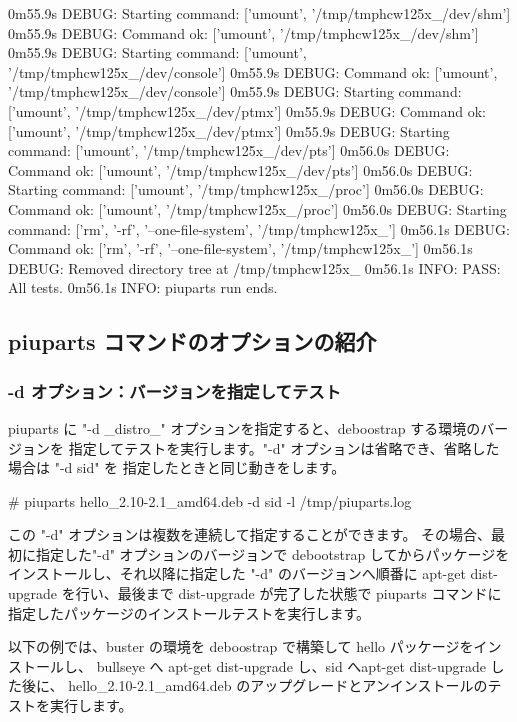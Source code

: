 \documentclass[mingoth,a4paper]{jsarticle}
\begin{document}
\begin{commandline}
0m55.9s DEBUG: Starting command: ['umount', '/tmp/tmphcw125x_/dev/shm']
0m55.9s DEBUG: Command ok: ['umount', '/tmp/tmphcw125x_/dev/shm']
0m55.9s DEBUG: Starting command: ['umount', '/tmp/tmphcw125x_/dev/console']
0m55.9s DEBUG: Command ok: ['umount', '/tmp/tmphcw125x_/dev/console']
0m55.9s DEBUG: Starting command: ['umount', '/tmp/tmphcw125x_/dev/ptmx']
0m55.9s DEBUG: Command ok: ['umount', '/tmp/tmphcw125x_/dev/ptmx']
0m55.9s DEBUG: Starting command: ['umount', '/tmp/tmphcw125x_/dev/pts']
0m56.0s DEBUG: Command ok: ['umount', '/tmp/tmphcw125x_/dev/pts']
0m56.0s DEBUG: Starting command: ['umount', '/tmp/tmphcw125x_/proc']
0m56.0s DEBUG: Command ok: ['umount', '/tmp/tmphcw125x_/proc']
0m56.0s DEBUG: Starting command: ['rm', '-rf', '--one-file-system', '/tmp/tmphcw125x_']
0m56.1s DEBUG: Command ok: ['rm', '-rf', '--one-file-system', '/tmp/tmphcw125x_']
0m56.1s DEBUG: Removed directory tree at /tmp/tmphcw125x_
0m56.1s INFO: PASS: All tests.
0m56.1s INFO: piuparts run ends.
\end{commandline}


\subsection{piuparts コマンドのオプションの紹介}

\subsubsection{-d オプション：バージョンを指定してテスト}

piuparts に "-d \_distro\_" オプションを指定すると、deboostrap する環境のバージョンを
指定してテストを実行します。"-d" オプションは省略でき、省略した場合は "-d sid" を
指定したときと同じ動きをします。

\begin{commandline}
# piuparts hello_2.10-2.1_amd64.deb -d sid -l /tmp/piuparts.log
\end{commandline}

この "-d" オプションは複数を連続して指定することができます。
その場合、最初に指定した"-d" オプションのバージョンで debootstrap してからパッケージをインストールし、それ以降に指定した "-d" のバージョンへ順番に apt-get dist-upgrade を行い、最後まで dist-upgrade が完了した状態で piuparts コマンドに指定したパッケージのインストールテストを実行します。

以下の例では、buster の環境を deboostrap で構築して hello パッケージをインストールし、
bullseye へ apt-get dist-upgrade し、sid へapt-get dist-upgrade した後に、
hello\_2.10-2.1\_amd64.deb のアップグレードとアンインストールのテストを実行します。
\end{document}
